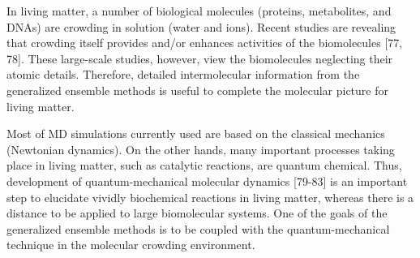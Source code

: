 In living matter, a number of biological molecules (proteins, metabolites, and DNAs) are crowding in solution (water and ions). Recent studies are revealing that crowding itself provides and/or enhances activities of the biomolecules [77, 78]. These large-scale studies, however, view the biomolecules neglecting their atomic details. Therefore, detailed intermolecular information from the generalized ensemble methods is useful to complete the molecular picture for living matter. 

Most of MD simulations currently used are based on the classical mechanics (Newtonian dynamics). On the other hands, many important processes taking place in living matter, such as catalytic reactions, are quantum chemical. Thus, development of quantum-mechanical molecular dynamics [79-83] is an important step to elucidate vividly biochemical reactions in living matter, whereas there is a distance to be applied to large biomolecular systems. One of the goals of the generalized ensemble methods is to be coupled with the quantum-mechanical technique in the molecular crowding environment.
